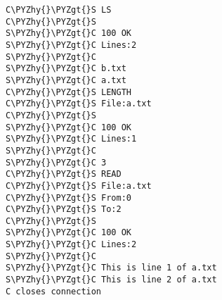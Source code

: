 \begin{Verbatim}[commandchars=\\\{\}]
C\PYZhy{}\PYZgt{}S LS
C\PYZhy{}\PYZgt{}S 
S\PYZhy{}\PYZgt{}C 100 OK
S\PYZhy{}\PYZgt{}C Lines:2
S\PYZhy{}\PYZgt{}C
S\PYZhy{}\PYZgt{}C b.txt
S\PYZhy{}\PYZgt{}C a.txt
C\PYZhy{}\PYZgt{}S LENGTH
C\PYZhy{}\PYZgt{}S File:a.txt
C\PYZhy{}\PYZgt{}S 
S\PYZhy{}\PYZgt{}C 100 OK
S\PYZhy{}\PYZgt{}C Lines:1
S\PYZhy{}\PYZgt{}C 
S\PYZhy{}\PYZgt{}C 3
C\PYZhy{}\PYZgt{}S READ
C\PYZhy{}\PYZgt{}S File:a.txt
C\PYZhy{}\PYZgt{}S From:0
C\PYZhy{}\PYZgt{}S To:2
C\PYZhy{}\PYZgt{}S 
S\PYZhy{}\PYZgt{}C 100 OK
S\PYZhy{}\PYZgt{}C Lines:2
S\PYZhy{}\PYZgt{}C 
S\PYZhy{}\PYZgt{}C This is line 1 of a.txt
S\PYZhy{}\PYZgt{}C This is line 2 of a.txt
C closes connection
\end{Verbatim}
